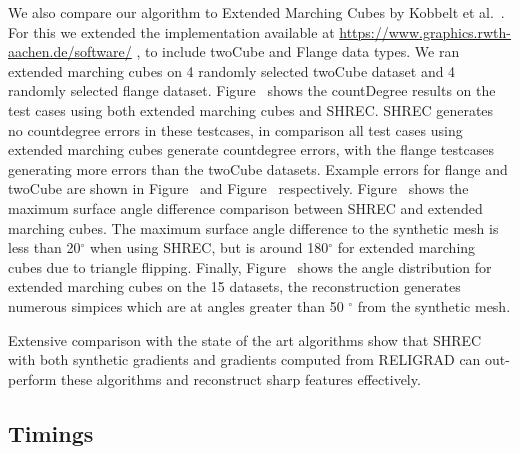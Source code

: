 We also compare our algorithm to Extended Marching Cubes by Kobbelt et al.~\cite{kbsh-fssev-01}. For this we extended the implementation available at \url{https://www.graphics.rwth-aachen.de/software/} \href{https://www.graphics.rwth-aachen.de/software/}{}, to include twoCube and Flange data types. We ran extended marching cubes on 4 randomly selected twoCube dataset and 4 randomly selected flange dataset. Figure~\protect{} shows the countDegree results on the test cases using both extended marching cubes and SHREC. SHREC generates no countdegree errors in these testcases, in comparison all test cases using extended marching cubes generate countdegree errors, with the flange testcases generating more errors than the twoCube datasets. Example errors for flange and twoCube are shown in Figure~\protect{} and Figure~\protect{} respectively. Figure~\protect{} shows the maximum surface angle difference comparison between SHREC and extended marching cubes. The maximum surface angle difference to the synthetic mesh is less than 20$^\circ$ when using SHREC, but is around 180$^\circ$ for extended marching cubes due to triangle flipping. Finally, Figure~\protect{} shows the angle distribution for extended marching cubes on the 15 datasets, the reconstruction generates numerous simpices which are at angles greater than 50 $^\circ$ from the synthetic mesh. 

Extensive comparison with the state of the art algorithms show that SHREC with both synthetic gradients and gradients computed from RELIGRAD can out-perform these algorithms and reconstruct sharp features effectively. 


\subsection{Timings}


